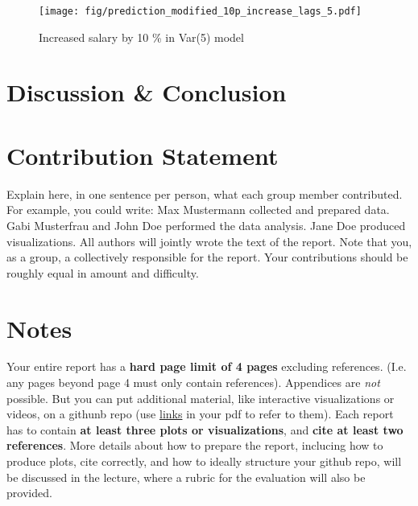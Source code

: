 \documentclass{article}
\theoremstyle{plain}
\theoremstyle{definition}
\theoremstyle{remark}
\begin{document}
\begin{figure}[H]
    \centering
    \texttt{[image: fig/prediction\_modified\_10p\_increase\_lags\_5.pdf]}
    \caption{Increased salary by 10 \% in Var(5) model}
\end{figure}






\section{Discussion \& Conclusion}\label{sec:conclusion}



\section*{Contribution Statement}

Explain here, in one sentence per person, what each group member contributed. For example, you could write: Max Mustermann collected and prepared data. Gabi Musterfrau and John Doe performed the data analysis. Jane Doe produced visualizations. All authors will jointly wrote the text of the report. Note that you, as a group, a collectively responsible for the report. Your contributions should be roughly equal in amount and difficulty.

\section*{Notes} 

Your entire report has a \textbf{hard page limit of 4 pages} excluding references. (I.e. any pages beyond page 4 must only contain references). Appendices are \emph{not} possible. But you can put additional material, like interactive visualizations or videos, on a githunb repo (use \href{https://github.com/pnkraemer/tueplots}{links} in your pdf to refer to them). Each report has to contain \textbf{at least three plots or visualizations}, and \textbf{cite at least two references}. More details about how to prepare the report, inclucing how to produce plots, cite correctly, and how to ideally structure your github repo, will be discussed in the lecture, where a rubric for the evaluation will also be provided.




\end{document}
